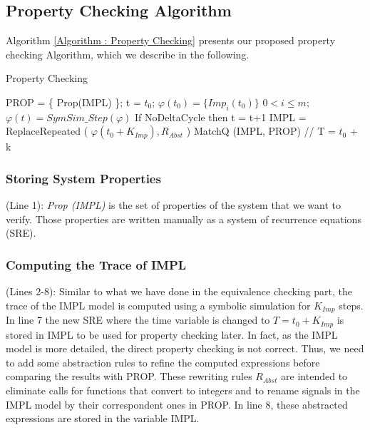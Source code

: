 \documentclass[submission,copyright,creativecommons]{eptcs}
\begin{document}
\subsection{Property Checking Algorithm}
Algorithm \ref{Algorithm : Property Checking} presents our proposed property checking Algorithm, which we describe in the following.

\begin{algorithm}
\caption{Property Checking}
\label{Algorithm : Property Checking}
\begin{algorithmic}[1]
\STATE PROP = \{ Prop(IMPL) \};
\STATE t = \(t_{0}\);
\STATE   \( \varphi(t_{0}) =  \{ Imp_{i}(t_{0})\}\)  \(0 < i \leq m;\)
\STATE \( \varphi(t) = SymSim\_Step(\varphi) \)
\STATE If NoDeltaCycle then t = t+1
\ENDWHILE
\STATE IMPL = ReplaceRepeated ( \( \varphi (t_{0}+K_{Imp}) , R_{Abst} \) )
\STATE MatchQ  (IMPL, PROP) // T = \(t_{0}\) + k

\end{algorithmic}
\end{algorithm}

\subsubsection{Storing System Properties}

(Line 1): \emph{Prop (IMPL)} is the set of properties of the system that we want to verify. Those properties are written manually as a system of recurrence equations (SRE).

\subsubsection{Computing the Trace of IMPL}

(Lines 2-8): Similar to what we have done in the equivalence checking part, the trace of the IMPL model is computed using a symbolic simulation for \(K_{Imp}\) steps. In line 7 the new SRE where the time variable is changed to \(T = t_{0}+K_{Imp}\) is stored in IMPL to be used for property checking later. In fact, as the IMPL model is more detailed, the direct property checking is not correct. Thus, we need to add some abstraction rules to refine the computed expressions before comparing the results with PROP. These rewriting rules \(R_{Abst}\) are intended to eliminate calls for functions that convert to integers and to rename signals in the IMPL model by their correspondent ones in PROP. In line 8, these abstracted expressions are stored in the variable IMPL.
\end{document}
